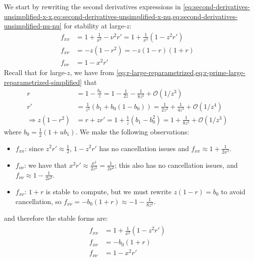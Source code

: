 \documentclass{article}
\begin{document}
We start by rewriting the second derivatives expressions in \cref{eq:second-derivatives-unsimplified-x-x,eq:second-derivatives-unsimplified-x-nu,eq:second-derivatives-unsimplified-nu-nu} for stability at large-$z$:
%
\begin{align}
  f_{xx}     & = 1 + \frac{1}{x^2} - \nu^2 r' = 1 + \frac{1}{x^2}(1 - z^2 r') \\
  f_{x\nu}   & = -z(1 - r^2) = -z (1 - r) (1 + r)                             \\
  f_{\nu\nu} & = 1 - x^2 r'
\end{align}
%
Recall that for large-$z$, we have from \cref{eq:r-large-reparametrized,eq:r-prime-large-reparametrized-simplified} that
\begin{align}
  r                      & = 1 - \frac{b_0}{z} = 1 - \frac{1}{2z} - \frac{1}{8z^2} + \mathcal{O}(1/z^3)                \\
  r'                     & = \frac{1}{z^2} (b_1 + b_0(1 - b_0)) = \frac{1}{2z^2} + \frac{1}{4z^3} + \mathcal{O}(1/z^4) \\
  \Rightarrow z(1 - r^2) & = r + z r' = 1 + \frac{1}{z} (b_1 - b_0^2) = 1 + \frac{1}{8z^2} + \mathcal{O}(1/z^3)
\end{align}
where $b_0 = \frac{1}{2} (1 + u b_1)$.
%
We make the following observations:
%
\begin{itemize}
  \item $f_{xx}$:
        since $z^2 r' \approx \frac{1}{2}$, $1 - z^2 r'$ has no cancellation issues and $f_{xx} \approx 1 + \frac{1}{2x^2}$.
  \item $f_{\nu\nu}$:
        we have that $x^2 r' \approx \frac{x^2}{2z^2} = \frac{1}{2\nu^2}$;
        this also has no cancellation issues, and $f_{\nu\nu} \approx 1 - \frac{1}{2\nu^2}$.
  \item $f_{x\nu}$:
        $1 + r$ is stable to compute, but we must rewrite $z(1 - r) = b_0$ to avoid cancellation, so $f_{x\nu} = -b_0(1 + r) \approx -1 - \frac{1}{8z^2}$.
\end{itemize}
%
and therefore the stable forms are:
%
\begin{align}\label{eq:second-derivatives-large-z}
  \boxed{
    \begin{aligned}
      f_{xx}     & = 1 + \frac{1}{x^2}(1 - z^2 r') \\
      f_{x\nu}   & = -b_0 (1 + r)                  \\
      f_{\nu\nu} & = 1 - x^2 r'
    \end{aligned}
  }
\end{align}
\end{document}

